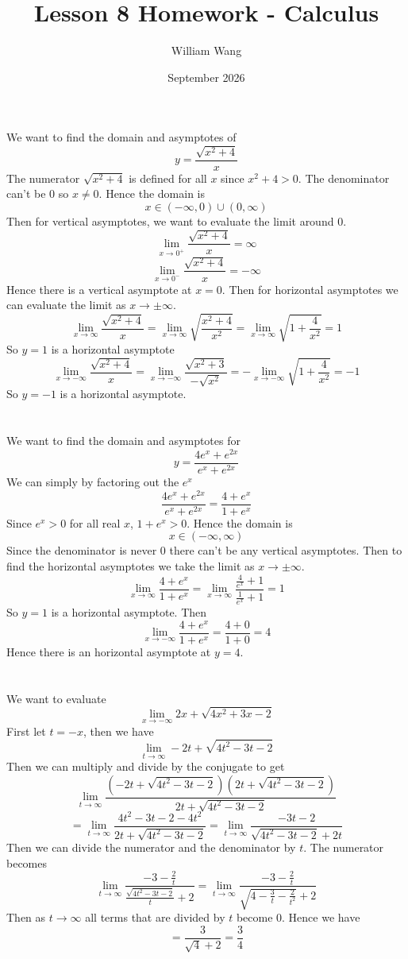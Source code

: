 \documentclass{article}
\title{Lesson 8 Homework - Calculus}
\author{William Wang}
\date{September 2026}
\begin{document}
\maketitle

\section{}
We want to find the domain and asymptotes of 
\[y = \frac{\sqrt{x^2+4}}{x}\]
The numerator \(\sqrt{x^2+4}\) is defined for all \(x\) since \(x^2+4 > 0\). The denominator can't be \(0\) so \(x\neq 0\). Hence the domain is 
\[x\in (-\infty, 0) \cup (0, \infty)\]
Then for vertical asymptotes, we want to evaluate the limit around \(0\). 
\[\lim_{x\to 0^+} \frac{\sqrt{x^2+4}}{x} = \infty\]
\[\lim_{x\to 0^-} \frac{\sqrt{x^2+4}}{x} = -\infty\]
Hence there is a vertical asymptote at \(x=0\). Then for horizontal asymptotes we can evaluate the limit as \(x \to \pm \infty\). 
\[\lim_{x\to \infty} \frac{\sqrt{x^2+4}}{x} = \lim_{x\to\infty} \sqrt{\frac{x^2+4}{x^2}} = \lim_{x\to \infty} \sqrt{1+\frac{4}{x^2}} = 1\]
So \(y = 1\) is a horizontal asymptote
\[\lim_{x\to -\infty} \frac{\sqrt{x^2+4}}{x} = \lim_{x\to -\infty} \frac{\sqrt{x^2+3}}{-\sqrt{x^2}} = -\lim_{x\to -\infty} \sqrt{1+\frac{4}{x^2}} = -1\]
So \(y = -1\) is a horizontal asymptote. 
\section{}
We want to find the domain and asymptotes for 
\[y = \frac{4e^x + e^{2x}}{e^x + e^{2x}}\]
We can simply by factoring out the \(e^x\)
\[\frac{4e^x+e^{2x}}{e^x+e^{2x}} = \frac{4+e^x}{1+e^x}\]
Since \(e^x > 0\) for all real \(x\), \(1+e^x>0\). Hence the domain is 
\[x \in (-\infty, \infty)\]
Since the denominator is never \(0\) there can't be any vertical asymptotes. Then to find the horizontal asymptotes we take the limit as \(x\to \pm \infty\). 
\[\lim_{x\to \infty} \frac{4+e^x}{1+e^x} = \lim_{x\to\infty} \frac{\frac{4}{e^x}+1}{\frac{1}{e^x}+1} = 1\]
So \(y = 1\) is a horizontal asymptote. Then 
\[\lim_{x\to -\infty} \frac{4+e^x}{1+e^x} = \frac{4+0}{1+0} = 4\]
Hence there is an horizontal asymptote at \(y = 4\). 

\section{}
We want to evaluate 
\[\lim_{x\to -\infty}2x+\sqrt{4x^2+3x-2}\]
First let \(t = -x\), then we have 
\[\lim_{t\to \infty} -2t + \sqrt{4t^2-3t-2}\]
Then we can multiply and divide by the conjugate to get 
\[\lim_{t\to \infty} \frac{(-2t+\sqrt{4t^2-3t-2})(2t+\sqrt{4t^2-3t-2})}{2t+\sqrt{4t^2-3t-2}}\]\[= \lim_{t\to \infty} \frac{4t^2-3t-2-4t^2}{2t+\sqrt{4t^2-3t-2}} = \lim_{t\to \infty} \frac{-3t-2}{\sqrt{4t^2-3t-2}+2t}\]
Then we can divide the numerator and the denominator by \(t\). The numerator becomes
\[\lim_{t\to \infty} \frac{-3-\frac{2}{t}}{\frac{\sqrt{4t^2-3t-2}}{t} + 2} = \lim_{t\to\infty}\frac{-3-\frac{2}{t}}{\sqrt{4-\frac{3}{t}-\frac{2}{t^2}}+2}\]
Then as \(t\to \infty\) all terms that are divided by \(t\) become \(0\). Hence we have 
\[=\frac{3}{\sqrt{4}+2} = \frac{3}{4}\]
\end{document}
